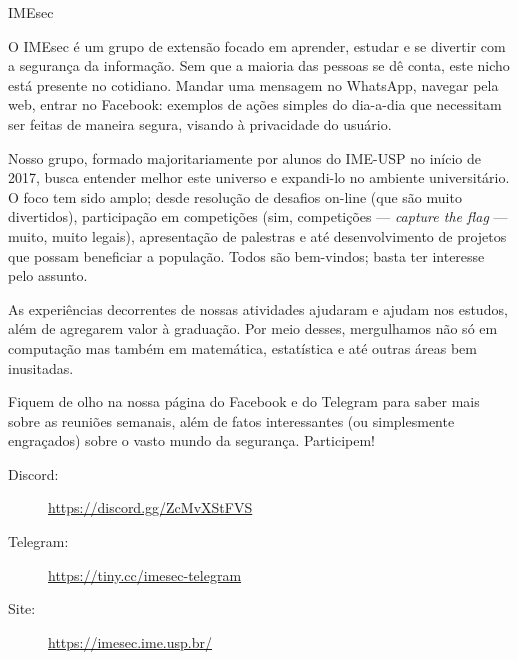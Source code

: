 \begin{subsecao}{IMEsec}


O IMEsec é um grupo de extensão focado em aprender, estudar e se divertir com a
segurança da informação. Sem que a maioria das pessoas se dê conta, este nicho
está presente no cotidiano. Mandar uma mensagem no WhatsApp, navegar pela web,
entrar no Facebook: exemplos de ações simples do dia-a-dia que necessitam ser
feitas de maneira segura, visando à privacidade do usuário.

Nosso grupo, formado majoritariamente por alunos do IME-USP no início de 2017,
busca entender melhor este universo e expandi-lo no ambiente universitário. O
foco tem sido amplo; desde resolução de desafios on-line (que são muito
divertidos), participação em competições (sim, competições — \textit{capture the
flag} — muito, muito legais), apresentação de palestras e até desenvolvimento de
projetos que possam beneficiar a população. Todos são bem-vindos; basta ter
interesse pelo assunto.

As experiências decorrentes de nossas atividades ajudaram e ajudam nos estudos,
além de agregarem valor à graduação. Por meio desses, mergulhamos não só em
computação mas também em matemática, estatística e até outras áreas bem
inusitadas.

Fiquem de olho na nossa página do Facebook e do Telegram para saber mais sobre
as reuniões semanais, além de fatos interessantes (ou simplesmente engraçados)
sobre o vasto mundo da segurança. Participem!

\begin{description}
  \item[Discord:] \url{https://discord.gg/ZcMvXStFVS}
  \item[Telegram:] \url{https://tiny.cc/imesec-telegram}
  \item[Site:] \url{https://imesec.ime.usp.br/}
\end{description}

\end{subsecao}
